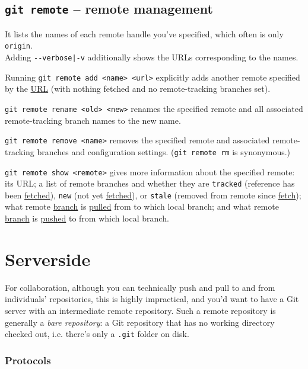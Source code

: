 \documentclass[8pt, table, xcdraw]{article}%
\begin{document}
\subsection{\lstinline{git remote} -- remote management} \label{remote}

It lists the names of each remote handle you've specified, which often is only \lstinline{origin}.\\
Adding \lstinline{--verbose|-v} additionally shows the URLs corresponding to the names.

Running \lstinline{git remote add <name> <url>} explicitly adds another remote specified by the \hyperref[protocols]{URL} (with nothing fetched and no remote-tracking branches set).

\lstinline{git remote rename <old> <new>} renames the specified remote and all associated remote-tracking branch names to the new name.

\lstinline{git remote remove <name>} removes the specified remote and associated remote-tracking branches and configuration settings. (\lstinline{git remote rm} is synonymous.)

\lstinline{git remote show <remote>} gives more information about the specified remote: its URL; a list of remote branches and whether they are \lstinline{tracked} (reference has been \hyperref[fetch]{fetched}), \lstinline{new} (not yet \hyperref[fetch]{fetched}), or \lstinline{stale} (removed from remote since \hyperref[fetch]{fetch}); what remote \hyperref[branching]{branch} is \hyperref[pull]{pulled} from to which local branch; and what remote \hyperref[branching]{branch} is \hyperref[push]{pushed} to from which local branch.

\section{Serverside} 

For collaboration, although you can technically push and pull to and from individuals' repositories, this is highly impractical, and you'd want to have a Git server with an intermediate remote repository. Such a remote repository is generally a \emph{bare repository}: a Git repository that has no working directory checked out, i.e. there's only a \lstinline{.git} folder on disk.

\subsubsection{Protocols} \label{protocols}
\end{document}
